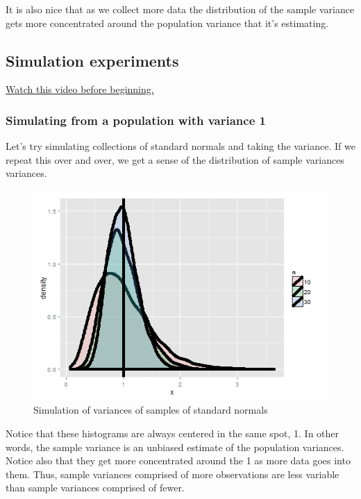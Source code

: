 \documentclass[]{article}
\begin{document}
It is also nice that as we collect more data the distribution of the
sample variance gets more concentrated around the population variance
that it's estimating.

\subsection{Simulation experiments}\label{simulation-experiments-1}

\href{http://youtu.be/uPjHB9JjGKI?list=PLpl-gQkQivXiBmGyzLrUjzsblmQsLtkzJ}{Watch
this video before beginning.}

\subsubsection{Simulating from a population with variance
1}\label{simulating-from-a-population-with-variance-1}

Let's try simulating collections of standard normals and taking the
variance. If we repeat this over and over, we get a sense of the
distribution of sample variances variances.

\begin{figure}[htbp]
\centering
\includegraphics{LeanPub/images/normalVariances-1.png}
\caption{Simulation of variances of samples of standard normals}
\end{figure}

Notice that these histograms are always centered in the same spot, 1. In
other words, the sample variance is an unbiased estimate of the
population variances. Notice also that they get more concentrated around
the 1 as more data goes into them. Thus, sample variances comprised of
more observations are less variable than sample variances comprised of
fewer.
\end{document}
